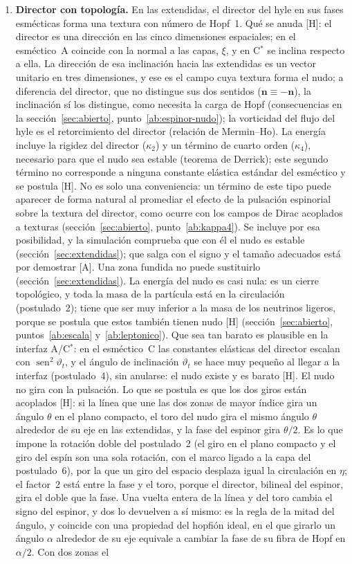 \documentclass[11pt,a4paper]{article}
\newcommand{\st}[1]{\textup{[#1]}}
\newcommand{\Cst}{C\ensuremath{^{*}}}
\newcommand{\vb}[1]{\symbf{#1}}
\begin{document}
\begin{enumerate}[label=\arabic*.,leftmargin=*]
\item \textbf{Director con topología.} En las extendidas, el director del hyle en sus fases esmécticas forma una textura con número de Hopf~1. Qué se anuda \st{H}: el director es una dirección en las cinco dimensiones espaciales; en el esméctico~A coincide con la normal a las capas, $\xi$, y en \Cst{} se inclina respecto a ella. La dirección de esa inclinación hacia las extendidas es un vector unitario en tres dimensiones, y ese es el campo cuya textura forma el nudo; a diferencia del director, que no distingue sus dos sentidos ($\vb{n}\equiv-\vb{n}$), la inclinación sí los distingue, como necesita la carga de Hopf (consecuencias en la sección~\ref{sec:abierto}, punto~\ref{ab:espinor-nudo}); la vorticidad del flujo del hyle es el retorcimiento del director (relación de Mermin--Ho). La energía incluye la rigidez del director ($\kappa_2$) y un término de cuarto orden ($\kappa_4$), necesario para que el nudo sea estable (teorema de Derrick); este segundo término no corresponde a ninguna constante elástica estándar del esméctico y se postula \st{H}. No es solo una conveniencia: un término de este tipo puede aparecer de forma natural al promediar el efecto de la pulsación espinorial sobre la textura del director, como ocurre con los campos de Dirac acoplados a texturas (sección~\ref{sec:abierto}, punto~\ref{ab:kappa4}). Se incluye por esa posibilidad, y la simulación comprueba que con él el nudo es estable (sección~\ref{sec:extendidas}); que salga con el signo y el tamaño adecuados está por demostrar \st{A}. Una zona fundida no puede sustituirlo (sección~\ref{sec:extendidas}). La energía del nudo es casi nula: es un cierre topológico, y toda la masa de la partícula está en la circulación (postulado~2); tiene que ser muy inferior a la masa de los neutrinos ligeros, porque se postula que estos también tienen nudo \st{H} (sección~\ref{sec:abierto}, puntos~\ref{ab:escala} y~\ref{ab:leptonico}). Que sea tan barato es plausible en la interfaz A/\Cst: en el esméctico~C las constantes elásticas del director escalan con $\operatorname{sen}^2\vartheta_t$, y el ángulo de inclinación $\vartheta_t$ se hace muy pequeño al llegar a la interfaz (postulado~4), sin anularse: el nudo existe y es barato \st{H}. El nudo no gira con la pulsación. Lo que se postula es que los dos giros están acoplados \st{H}: si la línea que une las dos zonas de mayor índice gira un ángulo $\theta$ en el plano compacto, el toro del nudo gira el mismo ángulo $\theta$ alrededor de su eje en las extendidas, y la fase del espinor gira $\theta/2$. Es lo que impone la rotación doble del postulado~2 (el giro en el plano compacto y el giro del espín son una sola rotación, con el marco ligado a la capa del postulado~6), por la que un giro del espacio desplaza igual la circulación en $\eta$; el factor~2 está entre la fase y el toro, porque el director, bilineal del espinor, gira el doble que la fase. Una vuelta entera de la línea y del toro cambia el signo del espinor, y dos lo devuelven a sí mismo: es la regla de la mitad del ángulo, y coincide con una propiedad del hopfión ideal, en el que girarlo un ángulo $\alpha$ alrededor de su eje equivale a cambiar la fase de su fibra de Hopf en $\alpha/2$. Con dos zonas el 
\end{enumerate}
\end{document}
